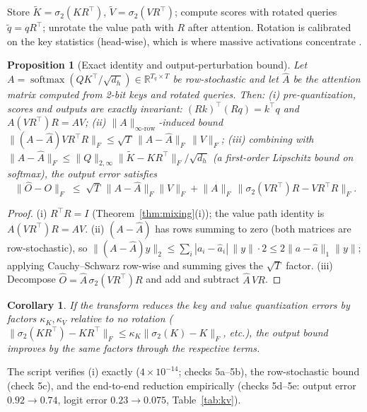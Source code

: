 \documentclass{article}
\newtheorem{proposition}{Proposition}
\newtheorem{corollary}{Corollary}
\newcommand{\R}{\mathbb{R}}
\newcommand{\norm}[1]{\lVert #1 \rVert}
\begin{document}
Store $\tilde K=\sigma_2(KR^\top)$, $\tilde V=\sigma_2(VR^\top)$; compute
scores with rotated queries $\tilde q=qR^\top$; unrotate the value path with
$R$ after attention. Rotation is calibrated on the key statistics
(head-wise), which is where massive activations concentrate
\citep{sun2024massive,su2025rotatekv}.

\begin{proposition}[Exact identity and output-perturbation bound]
\label{prop:kv}
Let $A=\operatorname{softmax}(QK^\top/\sqrt{d_h})\in\R^{T_q\times T}$ be
row-stochastic and let $\widehat A$ be the attention matrix computed from
2-bit keys and rotated queries. Then:
(i) pre-quantization, scores and outputs are exactly invariant:
$(Rk)^\top(Rq)=k^\top q$ and $A(VR^\top)R=AV$;
(ii) $\norm{A}_{\infty\text{-row}}$-induced bound
$\norm{(A-\widehat A)VR^\top R}_F\le\sqrt{T}\,\norm{A-\widehat A}_F\,\norm{V}_F$;
(iii) combining with
$\norm{A-\widehat A}_F\le\norm{Q}_{2,\infty}\norm{\tilde K-KR^\top}_F/\sqrt{d_h}$
(a first-order Lipschitz bound on softmax), the output error satisfies
\[
\norm{\widehat O-O}_F\;\le\;\sqrt{T}\,\norm{A-\widehat A}_F\norm{V}_F
+\norm{A}_{F}\,\norm{\sigma_2(VR^\top)R-VR^\top R}_F .
\]
\end{proposition}

\begin{proof}
(i) $R^\top R=I$ (Theorem~\ref{thm:mixing}(i)); the value path identity is
$A(VR^\top)R=AV$. (ii) $(A-\widehat A)$ has rows summing to zero
(both matrices are row-stochastic), so
$\norm{(A-\widehat A)y}_2\le\sum_i|a_i-\hat a_i|\,\norm{y}\cdot2\le
2\norm{a-\hat a}_1\norm{y}$; applying Cauchy--Schwarz row-wise and summing
gives the $\sqrt{T}$ factor. (iii) Decompose
$\widehat O=\widehat A\,\sigma_2(VR^\top)R$ and add and subtract
$\widehat A\,VR$.
\end{proof}

\begin{corollary}
\label{cor:kvbound}
If the transform reduces the key and value quantization errors by factors
$\kappa_K,\kappa_V$ relative to no rotation
($\norm{\sigma_2(KR^\top)-KR^\top}_F\le\kappa_K\norm{\sigma_2(K)-K}_F$, etc.),
the output bound improves by the same factors through the respective terms.
\end{corollary}

The script verifies (i) exactly ($4\times10^{-14}$; checks 5a--5b), the
row-stochastic bound (check 5c), and the end-to-end reduction empirically
(checks 5d--5e: output error $0.92\to0.74$, logit error $0.23\to0.075$,
Table~\ref{tab:kv}).
\end{document}

